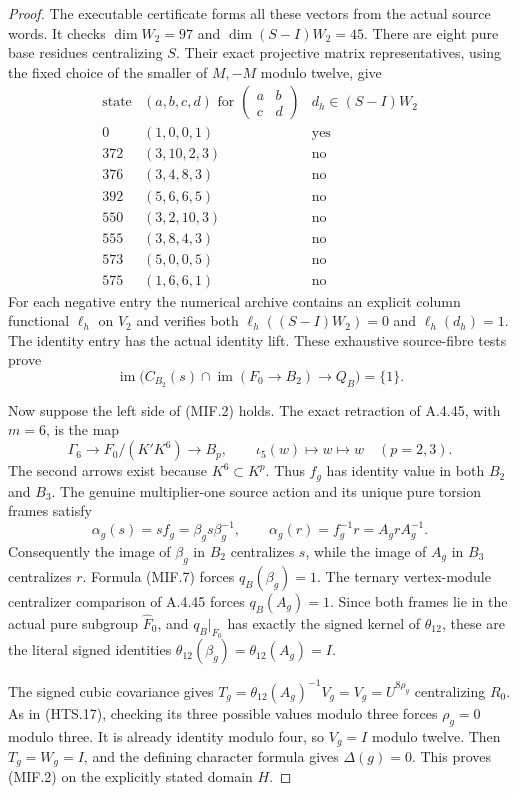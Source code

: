\begin{proof}
The executable certificate
 forms
all these vectors from the actual source words.
It checks $\dim W_2=97$ and
$\dim(S-I)W_2=45$.  There are eight pure base
residues centralizing $S$.  Their exact projective
matrix representatives, using the fixed choice
of the smaller of $M,-M$ modulo twelve, give
\[
\begin{array}{c|c|c}
 \text{state}&(a,b,c,d)\text{ for }
                  \begin{pmatrix}a&b\\c&d\end{pmatrix}
                       &d_h\in(S-I)W_2\\ \hline
 0&(1,0,0,1)&\text{yes}\\
 372&(3,10,2,3)&\text{no}\\
 376&(3,4,8,3)&\text{no}\\
 392&(5,6,6,5)&\text{no}\\
 550&(3,2,10,3)&\text{no}\\
 555&(3,8,4,3)&\text{no}\\
 573&(5,0,0,5)&\text{no}\\
 575&(1,6,6,1)&\text{no}
\end{array}                                            \tag{MIF.6}
\]
For each negative entry the numerical archive
contains an explicit column functional $\ell_h$
on $V_2$ and verifies both
$\ell_h((S-I)W_2)=0$ and $\ell_h(d_h)=1$.
The identity entry has the actual identity lift.
These exhaustive source-fibre tests prove
\[
 \operatorname{im}\bigl(
 C_{B_2}(s)\cap\operatorname{im}(F_0\to B_2)
                        \longrightarrow Q_B\bigr)=\{1\}.
 \tag{MIF.7}
\]

Now suppose the left side of (MIF.2) holds.
The exact retraction of A.4.45, with $m=6$,
is the map
\[
 \Gamma_6\longrightarrow F_0/(K'K^6)
                   \longrightarrow B_p,
 \qquad \iota_5(w)\longmapsto w\longmapsto w
                    \quad(p=2,3).
 \tag{MIF.8}
\]
The second arrows exist because $K^6\subset K^p$.
Thus $f_g$ has identity value in both $B_2$ and
$B_3$.  The genuine multiplier-one source action
and its unique pure torsion frames satisfy
\[
 \alpha_g(s)=s f_g=\beta_gs\beta_g^{-1},\qquad
 \alpha_g(r)=f_g^{-1}r=A_grA_g^{-1}.
 \tag{MIF.9}
\]
Consequently the image of $\beta_g$ in $B_2$
centralizes $s$, while the image of $A_g$ in
$B_3$ centralizes $r$.  Formula (MIF.7) forces
$q_B(\beta_g)=1$.  The ternary vertex-module
centralizer comparison of A.4.45 forces
$q_B(A_g)=1$.  Since both frames lie in the actual
pure subgroup $\widehat F_0$, and $q_B|_{F_0}$
has exactly the signed kernel of $\theta_{12}$,
these are the literal signed identities
$\theta_{12}(\beta_g)=\theta_{12}(A_g)=I$.

The signed cubic covariance gives
$T_g=\theta_{12}(A_g)^{-1}V_g=V_g=U^{8\rho_g}$
centralizing $R_0$.  As in (HTS.17), checking its
three possible values modulo three forces
$\rho_g=0$ modulo three.  It is already identity
modulo four, so $V_g=I$ modulo twelve.
Then $T_g=W_g=I$, and the defining character
formula gives $\Delta(g)=0$.  This proves (MIF.2)
on the explicitly stated domain $H$.
\end{proof}

